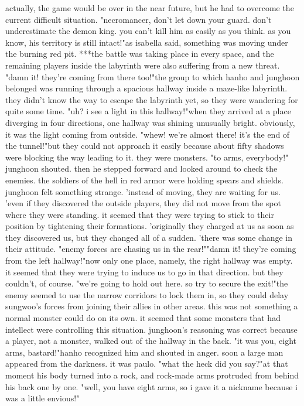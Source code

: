 actually, the game would be over in the near future, but he had to overcome the current difficult situation.
"necromancer, don't let down your guard.
 don't underestimate the demon king.
 you can't kill him as easily as you think.
 as you know, his territory is still intact!"as isabella said, something was moving under the burning red pit.
***the battle was taking place in every space, and the remaining players inside the labyrinth were also suffering from a new threat.
"damn it! they're coming from there too!"the group to which hanho and junghoon belonged was running through a spacious hallway inside a maze-like labyrinth.
 they didn't know the way to escape the labyrinth yet, so they were wandering for quite some time.
"uh? i see a light in this hallway!"when they arrived at a place diverging in four directions, one hallway was shining unusually bright.
 obviously, it was the light coming from outside.
"whew! we're almost there! it's the end of the tunnel!"but they could not approach it easily because about fifty shadows were blocking the way leading to it.
they were monsters.
"to arms, everybody!" junghoon shouted.
then he stepped forward and looked around to check the enemies.
the soldiers of the hell in red armor were holding spears and shields.
junghoon felt something strange.
'instead of moving, they are waiting for us.
'even if they discovered the outside players, they did not move from the spot where they were standing.
 it seemed that they were trying to stick to their position by tightening their formations.
'originally they charged at us as soon as they discovered us, but they changed all of a sudden.
'there was some change in their attitude.
"enemy forces are chasing us in the rear!""damn it! they're coming from the left hallway!"now only one place, namely, the right hallway was empty.
 it seemed that they were trying to induce us to go in that direction.
 but they couldn't, of course.
"we're going to hold out here.
 so try to secure the exit!"the enemy seemed to use the narrow corridors to lock them in, so they could delay sungwoo's forces from joining their allies in other areas.
this was not something a normal monster could do on its own.
 it seemed that some monsters that had intellect were controlling this situation.
junghoon's reasoning was correct because a player, not a monster, walked out of the hallway in the back.
"it was you, eight arms, bastard!"hanho recognized him and shouted in anger.
 soon a large man appeared from the darkness.
 it was paulo.
"what the heck did you say?"at that moment his body turned into a rock, and rock-made arms protruded from behind his back one by one.
"well, you have eight arms, so i gave it a nickname because i was a little envious!"


